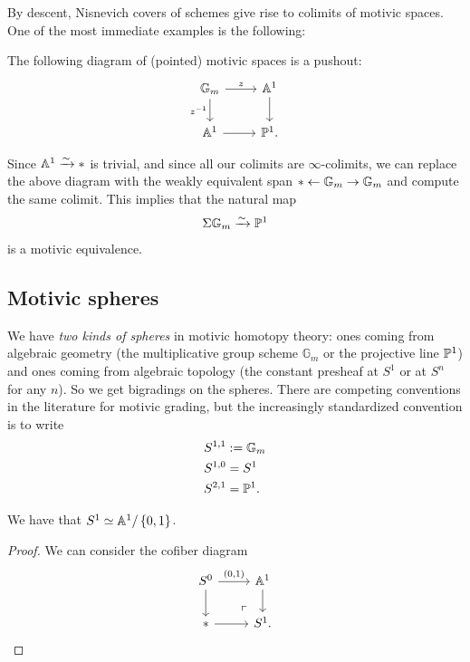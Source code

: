 \documentclass[11pt]{amsart}
\begin{document}
By descent, Nisnevich covers of schemes give rise to colimits of motivic spaces. One of the most immediate examples is the following:

\begin{example} The following diagram of (pointed) motivic spaces is a pushout:
\[ \begin{tikzcd}
    \mathbb{G}_m\rar["z"]\dar["z^{-1}" left] & \A^1\dar\\
    \A^1\rar & \P^1.
\end{tikzcd} \]
\end{example}
Since $\A^1 \xto{\sim} \ast$ is trivial, and since all our colimits are $\infty$-colimits, we can replace the above diagram with the weakly equivalent span $\ast \from \mathbb{G}_m \to \mathbb{G}_m$ and compute the same colimit. This implies that the natural map
\begin{equation}\label{eqn:suspension-gm-is-p1}
\begin{aligned}
    \Sigma \mathbb{G}_m \xto{\sim} \P^1
\end{aligned}
\end{equation}
is a motivic equivalence.

\subsection{Motivic spheres}

\begin{terminology} We have \textit{two kinds of spheres} in motivic homotopy theory: ones coming from algebraic geometry (the multiplicative group scheme $\mathbb{G}_m$ or the projective line $\P^1$) and ones coming from algebraic topology (the constant presheaf at $S^1$ or at $S^n$ for any $n$). So we get bigradings on the spheres. There are competing conventions in the literature for motivic grading, but the increasingly standardized convention is to write
\begin{align*}
    S^{1,1} &:= \mathbb{G}_m \\
    S^{1,0} &= S^1 \\
    S^{2,1} &= \P^1.
\end{align*}
\end{terminology}

\begin{example} We have that $S^1 \simeq \A^1/\left\{ 0,1 \right\}$.
\end{example}
\begin{proof} We can consider the cofiber diagram
\[ \begin{tikzcd}
    S^0\rar["{(0,1)}" above]\dar & \A^1\dar\\
    \ast\rar & S^1.\po
\end{tikzcd} \]
\end{proof}
\end{document}

